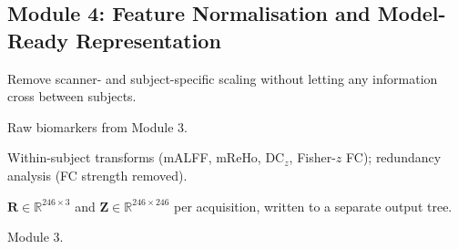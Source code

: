 \documentclass{ssnreview}
\begin{document}
\subsection{Module 4: Feature Normalisation and Model-Ready Representation}
\begin{modulebox}\begin{description}[leftmargin=2.6cm, style=nextline, font=\normalfont\bfseries\color{SSNBlue}]
  \item[Purpose] Remove scanner- and subject-specific scaling without
        letting any information cross between subjects.
  \item[Inputs] Raw biomarkers from Module 3.
  \item[Processing] Within-subject transforms (mALFF, mReHo, DC$_z$,
        Fisher-$z$ FC); redundancy analysis (FC strength removed).
  \item[Outputs] $\mathbf{R}\in\mathbb{R}^{246\times3}$ and
        $\mathbf{Z}\in\mathbb{R}^{246\times246}$ per acquisition, written to a
        separate output tree.
  \item[Dependencies] Module 3.
\end{description}\end{modulebox}
\end{document}
